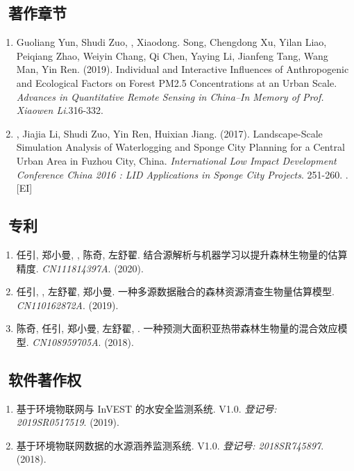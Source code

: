 \subsection*{\texorpdfstring{\faBook\ 著作章节}{著作章节}}
\begin{enumerate}
\item
    Guoliang Yun, Shudi Zuo, \Shaoqing, Xiaodong. Song, Chengdong Xu, Yilan Liao, Peiqiang Zhao, Weiyin Chang, Qi Chen, Yaying Li, Jianfeng Tang, Wang Man, Yin Ren. (2019).
	Individual and Interactive Influences of Anthropogenic and Ecological Factors on Forest PM2.5 Concentrations at an Urban Scale.
    \textit{Advances in Quantitative Remote Sensing in China–In Memory of Prof. Xiaowen Li}.316-332.
\item
    \Shaoqing, Jiajia Li, Shudi Zuo, Yin Ren, Huixian Jiang. (2017).
	Landscape-Scale Simulation Analysis of Waterlogging and Sponge City Planning for a Central Urban Area in Fuzhou City, China.
    \textit{International Low Impact Development Conference China 2016 : LID Applications in Sponge City Projects}. 251-260.
    . [EI]
\end{enumerate}

\subsection*{\texorpdfstring{\faBook\ 专利}{专利}}
\begin{enumerate}
\item
     任引, 郑小曼, {}, 陈奇, 左舒翟.
     结合源解析与机器学习以提升森林生物量的估算精度.
     \textit{CN111814397A}. (2020).
\item
     任引, {}, 左舒翟, 郑小曼.
     一种多源数据融合的森林资源清查生物量估算模型.
     \textit{CN110162872A}. (2019).
\item
     陈奇, 任引, 郑小曼, 左舒翟, {}.
     一种预测大面积亚热带森林生物量的混合效应模型.
     \textit{CN108959705A}. (2018).
\end{enumerate}

\subsection*{\texorpdfstring{\faBook\ 软件著作权}{软件著作权}}
\begin{enumerate}
\item
   基于环境物联网与 InVEST 的水安全监测系统. V1.0.
    \textit{登记号: 2019SR0517519}. (2019).
\item
    基于环境物联网数据的水源涵养监测系统. V1.0.
    \textit{登记号: 2018SR745897}. (2018).
\end{enumerate}

